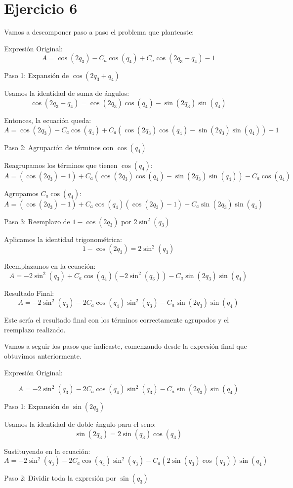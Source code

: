 \documentclass[a4paper,12pt]{article}
\begin{document}
\section{Ejercicio 6}
Vamos a descomponer paso a paso el problema que planteaste:

Expresión Original:
\[
A = \cos(2q_3) - C_a \cos(q_4) + C_a \cos(2q_3 + q_4) - 1
\]

Paso 1: Expansión de \(\cos(2q_3 + q_4)\)

Usamos la identidad de suma de ángulos:
\[
\cos(2q_3 + q_4) = \cos(2q_3)\cos(q_4) - \sin(2q_3)\sin(q_4)
\]

Entonces, la ecuación queda:
\[
A = \cos(2q_3) - C_a \cos(q_4) + C_a (\cos(2q_3)\cos(q_4) - \sin(2q_3)\sin(q_4)) - 1
\]

Paso 2: Agrupación de términos con \(\cos(q_4)\)

Reagrupamos los términos que tienen \(\cos(q_4)\):
\[
A = (\cos(2q_3) - 1) + C_a (\cos(2q_3)\cos(q_4) - \sin(2q_3)\sin(q_4)) - C_a \cos(q_4)
\]

Agrupamos \(C_a \cos(q_4)\):
\[
A = (\cos(2q_3) - 1) + C_a \cos(q_4)(\cos(2q_3) - 1) - C_a \sin(2q_3)\sin(q_4)
\]

Paso 3: Reemplazo de \(1 - \cos(2q_3)\) por \(2\sin^2(q_3)\)

Aplicamos la identidad trigonométrica:
\[
1 - \cos(2q_3) = 2\sin^2(q_3)
\]

Reemplazamos en la ecuación:
\[
A = -2\sin^2(q_3) + C_a \cos(q_4)(-2\sin^2(q_3)) - C_a \sin(2q_3)\sin(q_4)
\]

Resultado Final:
\[
A = -2\sin^2(q_3) - 2C_a \cos(q_4)\sin^2(q_3) - C_a \sin(2q_3)\sin(q_4)
\]

Este sería el resultado final con los términos correctamente agrupados y el reemplazo realizado.

Vamos a seguir los pasos que indicaste, comenzando desde la expresión final que obtuvimos anteriormente.

Expresión Original:

\[
A = -2\sin^2(q_3) - 2C_a \cos(q_4)\sin^2(q_3) - C_a \sin(2q_3)\sin(q_4)
\]

Paso 1: Expansión de \(\sin(2q_3)\)

Usamos la identidad de doble ángulo para el seno:
\[
\sin(2q_3) = 2\sin(q_3)\cos(q_3)
\]

Sustituyendo en la ecuación:
\[
A = -2\sin^2(q_3) - 2C_a \cos(q_4)\sin^2(q_3) - C_a (2\sin(q_3)\cos(q_3))\sin(q_4)
\]

Paso 2: Dividir toda la expresión por \(\sin(q_3)\)
\end{document}
